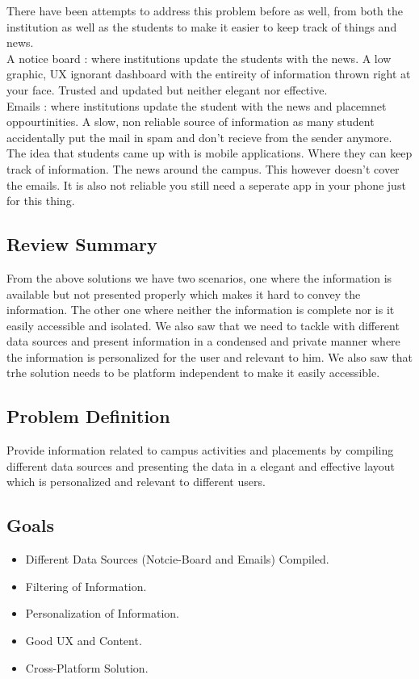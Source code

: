 \documentclass[14pt]{extarticle}
\begin{document}
There have been attempts to address this problem before as well, from both the institution as well as the students to make it easier to keep track of things and news.  \\

A notice board : where institutions update the students with the news. A low graphic, UX ignorant dashboard with the entireity of information thrown right at your face. Trusted and updated but neither elegant nor effective. \\
Emails : where institutions update the student with the news and placemnet oppourtinities. A slow, non reliable source of information as many student accidentally put the mail in spam and don't recieve from the sender anymore. \\  

The idea that students came up with is mobile applications. Where they can keep track of information. The news around the campus. This however doesn't cover the emails. It is also not reliable you still need a seperate app in your phone just for this thing.

\subsection{Review Summary}

From the above solutions we have two scenarios, one where the information is available but not presented properly which makes it hard to convey the information. The other one where neither the information is complete nor is it easily accessible and isolated. We also saw that we need to tackle with different data sources and present information in a condensed and private manner where the information is personalized for the user and relevant to him. We also saw that trhe solution needs to be platform independent to make it easily accessible.
\subsection{Problem Definition}

Provide information related to campus activities and placements by compiling different data sources and presenting the data in a elegant and effective layout which is personalized and relevant to different users.
\subsection{Goals}

\begin{itemize}
    \item Different Data Sources (Notcie-Board and Emails) Compiled.
    \item Filtering of Information.
    \item Personalization of Information.
    \item Good UX and Content.
    \item Cross-Platform Solution.
\end{itemize}
\end{document}
